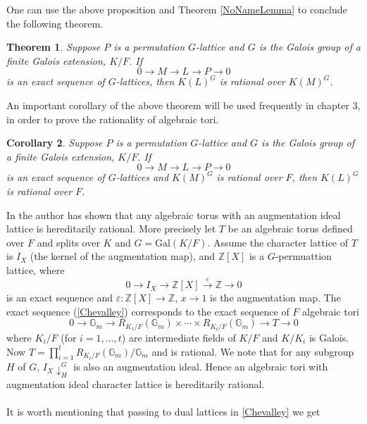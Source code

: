\documentclass[a4paper, 14pt]{extarticle}
\theoremstyle{plain}
\newtheorem{theorem}{Theorem}
\newtheorem{corollary}[theorem]{Corollary}
\theoremstyle{definition}
\newcommand{\Z}{\ensuremath{\mathbb{Z}}}
\begin{document}
\noindent
One can use the above proposition and Theorem \ref{NoNameLemma} to conclude the 
following theorem.
\begin{theorem}\cite[Proposition 1.6]{Lenstra}\label{method2}
Suppose $P$ is a permutation $G$-lattice and $G$ is the Galois group of a finite 
Galois extension, $K/F$.  If 
$$0 \longrightarrow M \longrightarrow L \longrightarrow P \longrightarrow 0 $$ is 
an exact sequence of $G$-lattices, then $K(L)^G$ is rational over $K(M)^G$.
\end{theorem}
\noindent
An important corollary of the above theorem will be used frequently in chapter 3, 
in order to prove the rationality of algebraic tori.
\begin{corollary}\label{permcoker}
Suppose $P$ is a permutation $G$-lattice and $G$ is the Galois group of a finite 
Galois extension, $K/F$.  If $$0 \longrightarrow M \longrightarrow L \longrightarrow P \longrightarrow 0 $$ 
is an exact sequence of $G$-lattices and $K(M)^G$ is rational over $F$, then $K(L)^G$ is rational over $F$.
\end{corollary}
\noindent
In \cite[Section 2.4.8]{Voskresenskii} the author has shown that any algebraic 
torus with an augmentation ideal lattice is hereditarily rational. More precisely 
let $T$ be an algebraic torus defined over $F$ and splits over $K$ and $G = \mathrm{Gal}(K/F)$. 
Assume the character lattice of $T$ is $I_X$ (the kernel of the augmentation map), 
and $\Z [X]$ is a $G$-permuattion lattice, where 
\begin{equation}\label{Chevalley}
0 \longrightarrow I_X \longrightarrow \Z [X] \overset{\varepsilon} \longrightarrow  \Z \longrightarrow 0
\end{equation}
is an exact sequence and $\varepsilon : \Z [X]  \rightarrow \Z $, $x \rightarrow 1$ 
is the augmentation map. The exact sequence (\ref{Chevalley}) corresponds to the exact 
sequence of $F$ algebraic tori
$$0 \longrightarrow \mathbb{G}_m \longrightarrow R_{K_1/F}(\mathbb{G}_m) \times \cdots \times R_{K_t/F}(\mathbb{G}_m) \longrightarrow  T \longrightarrow 0$$
where $K_i/F$ (for $i = 1, \ldots ,t $) are intermediate fields of $K/F$ and $K/K_i$ is 
Galois. Now $T = \prod^t_{i = 1}R_{K_i/F}(\mathbb{G}_m)/\mathbb{G}_m$ and is rational. 
We note that for any subgroup $H$ of $G$, ${I_X}\downarrow^G_H$ is also an augmentation 
ideal. Hence an algebraic tori with augmentation ideal character lattice is hereditarily 
rational.\\
\\
It is worth mentioning that passing to dual lattices in \ref{Chevalley} we get 
\end{document}
